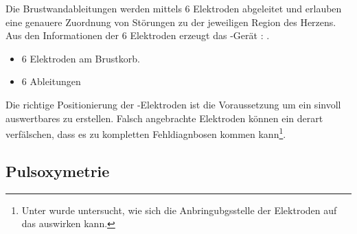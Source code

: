 {
Die Brustwandableitungen werden mittels 6 Elektroden abgeleitet und
erlauben eine genauere Zuordnung von Störungen zu der jeweiligen
Region des Herzens. Aus den Informationen der 6 Elektroden erzeugt das
-Gerät : . 
}{
\begin{itemize}
    \item 6 Elektroden am Brustkorb.
    \item 6 Ableitungen
\end{itemize}
}





\begin{table}[H]
\end{table}


Die richtige Positionierung der -Elektroden ist die Voraussetzung um
ein sinvoll auswertbares  zu erstellen. Falsch angebrachte
Elektroden können ein  derart verfälschen, dass es zu
kompletten Fehldiagnbosen kommen kann\footnote{Unter \cite{Schnelle200607}
wurde untersucht, wie sich die Anbringubgsstelle der Elektroden auf das
 auswirken kann. }.


\subsection{Pulsoxymetrie}

